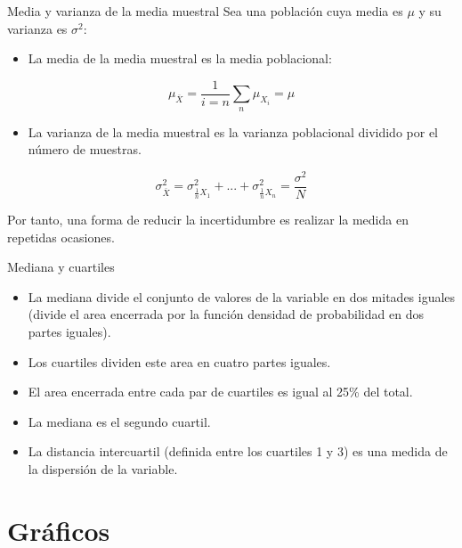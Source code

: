 \documentclass[aspectratio=169, usenames,svgnames,dvipsnames]{beamer}
\begin{document}
\begin{frame}[label={sec:orge152351}]{Media y varianza de la media muestral}
Sea una población cuya media es \(\mu\) y su varianza es \(\sigma^{2}\):

\begin{itemize}
\item La \alert{media de la media muestral} es la media poblacional:
\end{itemize}
\[
\mu_{\overline{X}}=\frac{1}{i = n}\sum_{n}\mu_{X_{i}} = \mu
\]

\begin{itemize}
\item La \alert{varianza de la media muestral} es la varianza poblacional dividido por el número de muestras.
\end{itemize}

\[
\sigma_{\overline{X}}^{2}=\sigma_{\frac{1}{n}X_{1}}^{2}+...+\sigma_{\frac{1}{n}X_{n}}^{2}=\frac{\sigma^2}{N}
\]

\begin{block}{}
Por tanto, una forma de \alert{reducir la incertidumbre} es realizar la
\alert{medida en repetidas ocasiones}.
\end{block}
\end{frame}



\begin{frame}[label={sec:org46cba0f}]{Mediana y cuartiles}
\begin{itemize}
\item La \alert{mediana} divide el conjunto de valores de la variable en \alert{dos
mitades} iguales (divide el area encerrada por la función densidad
de probabilidad en dos partes iguales).
\item Los \alert{cuartiles} dividen este area en \alert{cuatro} partes iguales.
\item El area encerrada entre cada par de cuartiles es igual al 25\% del total.
\item La \alert{mediana} es el \alert{segundo cuartil}.
\item La \alert{distancia intercuartil} (definida entre los cuartiles 1 y 3) es
una \alert{medida de la dispersión} de la variable.
\end{itemize}
\end{frame}


\section{Gráficos}
\label{sec:org06fb118}
\end{document}
